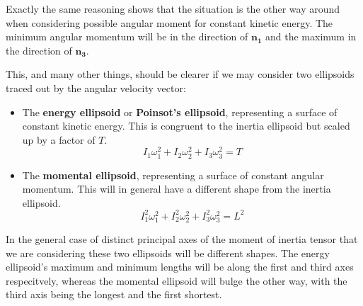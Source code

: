 \documentclass[a4paper, 12pt]{article}
\begin{document}
Exactly the same reasoning shows that the situation is the other way around when considering possible angular moment for constant kinetic energy. The minimum angular momentum will be in the direction of $\bm{n_1}$ and the maximum in the direction of $\bm{n_3}$.

This, and many other things, should be clearer if we may consider two ellipsoids traced out by the angular velocity vector:
\begin{itemize}
\item The {\bf energy ellipsoid} or {\bf Poinsot's ellipsoid}, representing a surface of constant kinetic energy. This is congruent to the inertia ellipsoid but scaled up by a factor of $T$.
  \begin{equation}\label{eq:energy_ellipsoid}
    I_1\omega_1^2 + I_2\omega_2^2 + I_3\omega_3^2 =T
  \end{equation}
\item The {\bf momental ellipsoid}, representing a surface of constant angular momentum. This will in general have a different shape from the inertia ellipsoid.
  \begin{equation}\label{eq:momental_ellipsoid}
    I_1^2\omega_1^2 + I_2^2\omega_2^2 + I_3^2\omega_3^2 = L^2
  \end{equation}
\end{itemize}

In the general case of distinct principal axes of the moment of inertia tensor that we are considering these two ellipsoids will be different shapes. The energy ellipsoid's maximum and minimum lengths will be along the first and third axes respecitvely, whereas the momental ellipsoid will bulge the other way, with the third axis being the longest and the first shortest.

%
%
%
\end{document}
